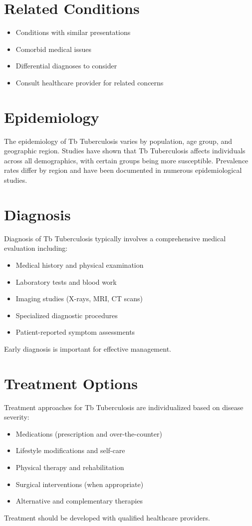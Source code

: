 \section*{Related Conditions}
\begin{itemize}
  \item Conditions with similar presentations
  \item Comorbid medical issues
  \item Differential diagnoses to consider
  \item Consult healthcare provider for related concerns
\end{itemize}

\section*{Epidemiology}
The epidemiology of Tb Tuberculosis varies by population, age group, and geographic region. Studies have shown that Tb Tuberculosis affects individuals across all demographics, with certain groups being more susceptible. Prevalence rates differ by region and have been documented in numerous epidemiological studies.

\section*{Diagnosis}
Diagnosis of Tb Tuberculosis typically involves a comprehensive medical evaluation including:
\begin{itemize}
  \item Medical history and physical examination
  \item Laboratory tests and blood work
  \item Imaging studies (X-rays, MRI, CT scans)
  \item Specialized diagnostic procedures
  \item Patient-reported symptom assessments
\end{itemize}
Early diagnosis is important for effective management.

\section*{Treatment Options}
Treatment approaches for Tb Tuberculosis are individualized based on disease severity:
\begin{itemize}
  \item Medications (prescription and over-the-counter)
  \item Lifestyle modifications and self-care
  \item Physical therapy and rehabilitation
  \item Surgical interventions (when appropriate)
  \item Alternative and complementary therapies
\end{itemize}
Treatment should be developed with qualified healthcare providers.


